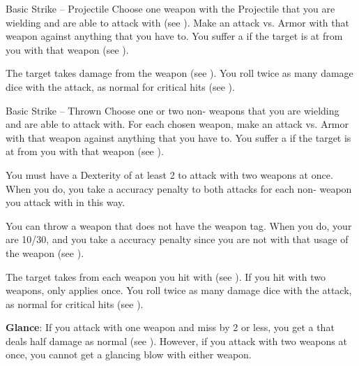         \begin{activeability}{Basic Strike -- Projectile}
            \label{Projectile Strike}
            \rankline
            Choose one weapon with the Projectile  that you are wielding and are able to attack with (see ).
            Make an attack vs. Armor with that weapon against anything that you have  to.
            You suffer a  if the target is at  from you with that weapon (see ).

            \hit The target takes damage from the weapon (see ).
            \crit You roll twice as many damage dice with the attack, as normal for critical hits (see ).
        \end{activeability}

        \begin{activeability}{Basic Strike -- Thrown}
            \label{Thrown Strike}
            \rankline
            Choose one or two non- weapons that you are wielding and are able to attack with.
            For each chosen weapon, make an attack vs. Armor with that weapon against anything that you have  to.
            You suffer a  if the target is at  from you with that weapon (see ).

            You must have a Dexterity of at least 2 to attack with two weapons at once.
            When you do, you take a  accuracy penalty to both attacks for each non- weapon you attack with in this way.

            You can throw a weapon that does not have the  weapon tag.
            When you do, your  are 10/30, and you take a  accuracy penalty since you are not  with that usage of the weapon (see ).

            \hit The target takes  from each weapon you hit with (see ).
            If you hit with two weapons,  only applies once.
            \crit You roll twice as many damage dice with the attack, as normal for critical hits (see ).
            \par \textbf{Glance}: If you attack with one weapon and miss by 2 or less, you get a  that deals half damage as normal (see ).
            However, if you attack with two weapons at once, you cannot get a glancing blow with either weapon.
        \end{activeability}

